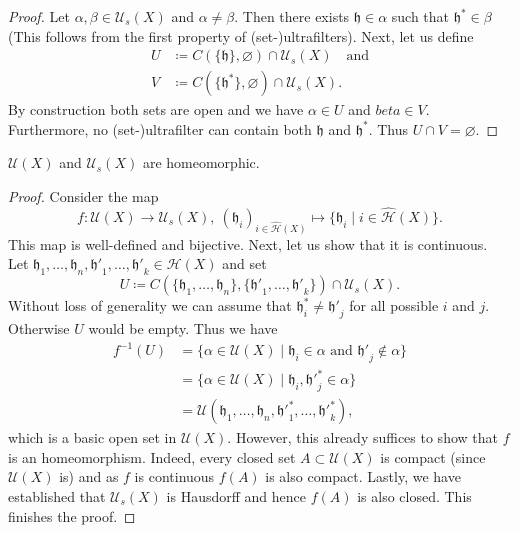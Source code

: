 \begin{proof}
  Let \(\alpha, \beta \in \mathcal{U}_s(X)\) and \(\alpha \neq \beta\). Then there exists \(\mathfrak{h} \in \alpha\) such that \(\mathfrak{h}^\ast \in \beta\) (This follows from the first property of (set-)ultrafilters). Next, let us define
  \begin{align*}
    U & \coloneqq C(\{\mathfrak{h}\}, \varnothing) \cap \mathcal{U}_s(X)\quad \text{and}\\
    V & \coloneqq C(\{\mathfrak{h}^\ast\},\varnothing) \cap \mathcal{U}_s(X).
  \end{align*}
  By construction both sets are open and we have \(\alpha \in U\) and \(beta \in V\). Furthermore, no (set-)ultrafilter can contain both \(\mathfrak{h}\) and \(\mathfrak{h}^\ast\). Thus \(U \cap V = \varnothing\). 
\end{proof}

\begin{thm}
  \(\mathcal{U}(X)\) and \(\mathcal{U}_s(X)\) are homeomorphic.
\end{thm}

\begin{proof}
  Consider the map
  \[
    f\colon \mathcal{U}(X) \to \mathcal{U}_s(X),\ (\mathfrak{h}_i)_{i \in \mathcal{\hat H}(X)} \mapsto \{\mathfrak{h}_i \mid i \in \mathcal{\hat H}(X)\}.
  \]
  This map is well-defined and bijective. Next, let us show that it is continuous. Let \(\mathfrak{h}_1, \dots, \mathfrak{h}_n, \mathfrak{h'}_1, \dots,\mathfrak{h'}_k \in \mathcal{H}(X)\) and set
  \[
    U \coloneqq C(\{\mathfrak{h}_1, \dots, \mathfrak{h}_n\}, \{\mathfrak{h'}_1, \dots, \mathfrak{h'}_k\}) \cap \mathcal{U}_s(X).
  \]
  Without loss of generality we can assume that \(\mathfrak{h}^\ast_i \neq \mathfrak{h'}_j\) for all possible \(i\) and \(j\). Otherwise \(U\) would be empty. Thus we have
  \begin{align*}
    f^{-1}(U)
    & = \{\alpha \in \mathcal{U}(X) \mid \mathfrak{h}_i \in \alpha \text{ and } \mathfrak{h'}_j \notin \alpha\}\\
    & = \{\alpha \in \mathcal{U}(X) \mid \mathfrak{h}_i, \mathfrak{h'}^\ast_j \in \alpha\}\\
    & = \mathcal{U}(\mathfrak{h}_1, \dots, \mathfrak{h}_n, \mathfrak{h'}^\ast_1, \dots, \mathfrak{h'}^\ast_k),
  \end{align*}
  which is a basic open set in \(\mathcal{U}(X)\). However, this already suffices to show that \(f\) is an homeomorphism. Indeed, every closed set \(A \subset \mathcal{U}(X)\) is compact (since \(\mathcal{U}(X)\) is) and as \(f\) is continuous \(f(A)\) is also compact. Lastly, we have established that \(\mathcal{U}_s(X)\) is Hausdorff and hence \(f(A)\) is also closed. This finishes the proof.
\end{proof}

